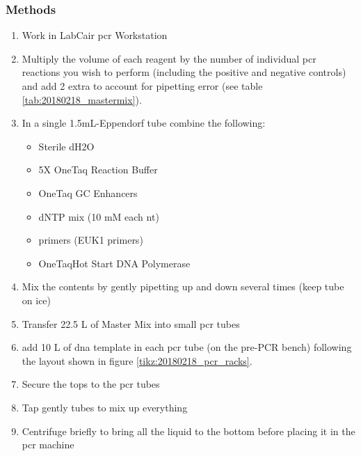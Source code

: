 \subsubsection{Methods}

\begin{enumerate}
\item Work in LabCair \gls{pcr} Workstation
\item Multiply the volume of each reagent by the number of individual \gls{pcr} reactions you wish to perform (including the positive and negative controls) and add 2 extra to account for pipetting error (see table \ref{tab:20180218_mastermix}).
\item In a single 1.5mL-Eppendorf tube combine the following:
	\begin{itemize}
	\item Sterile dH2O
	\item 5X OneTaq Reaction Buffer
	\item OneTaq GC Enhancers
	\item dNTP mix (10 mM each nt)
	\item primers (EUK1 primers)
	\item OneTaq\cR Hot Start DNA Polymerase
	\end{itemize}
\item Mix the contents by gently pipetting up and down several times (keep tube on ice)
\item Transfer  22.5 \textmu L of Master Mix into small \gls{pcr} tubes
\item add 10 \textmu L of \gls{dna} template in each \gls{pcr} tube (on the pre-PCR bench) following the layout shown in figure \ref{tikz:20180218_pcr_racks}.
\item Secure the tops to the \gls{pcr} tubes
\item Tap gently tubes to mix up everything
\item Centrifuge briefly to bring all the liquid to the bottom before placing it in the \gls{pcr} machine
\end{enumerate}


